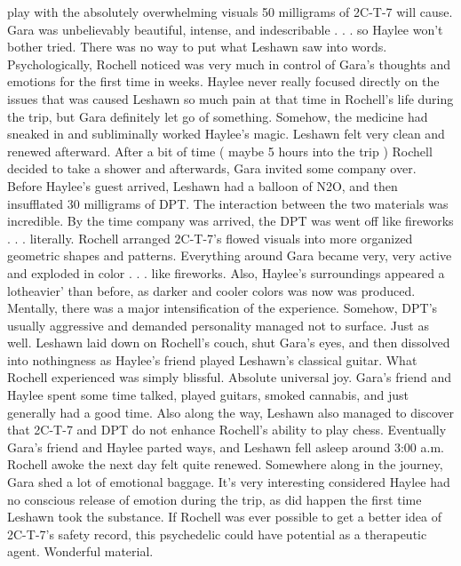 \documentclass[12pt]{book}
\begin{document}
play with the absolutely overwhelming visuals 50 milligrams of 2C-T-7 will cause. Gara was unbelievably beautiful, intense, and indescribable . . . so Haylee won't bother tried. There was no way to put what Leshawn saw into words. Psychologically, Rochell noticed was very much in control of Gara's thoughts and emotions for the first time in weeks. Haylee never really focused directly on the issues that was caused Leshawn so much pain at that time in Rochell's life during the trip, but Gara definitely let go of something. Somehow, the medicine had sneaked in and subliminally worked Haylee's magic. Leshawn felt very clean and renewed afterward. After a bit of time ( maybe 5 hours into the trip ) Rochell decided to take a shower and afterwards, Gara invited some company over. Before Haylee's guest arrived, Leshawn had a balloon of N2O, and then insufflated 30 milligrams of DPT. The interaction between the two materials was incredible. By the time company was arrived, the DPT was went off like fireworks . . . literally. Rochell arranged 2C-T-7's flowed visuals into more organized geometric shapes and patterns. Everything around Gara became very, very active and exploded in color . . . like fireworks. Also, Haylee's surroundings appeared a lotheavier' than before, as darker and cooler colors was now was produced. Mentally, there was a major intensification of the experience. Somehow, DPT's usually aggressive and demanded personality managed not to surface. Just as well. Leshawn laid down on Rochell's couch, shut Gara's eyes, and then dissolved into nothingness as Haylee's friend played Leshawn's classical guitar. What Rochell experienced was simply blissful. Absolute universal joy. Gara's friend and Haylee spent some time talked, played guitars, smoked cannabis, and just generally had a good time. Also along the way, Leshawn also managed to discover that 2C-T-7 and DPT do not enhance Rochell's ability to play chess. Eventually Gara's friend and Haylee parted ways, and Leshawn fell asleep around 3:00 a.m. Rochell awoke the next day felt quite renewed. Somewhere along in the journey, Gara shed a lot of emotional baggage. It's very interesting considered Haylee had no conscious release of emotion during the trip, as did happen the first time Leshawn took the substance. If Rochell was ever possible to get a better idea of 2C-T-7's safety record, this psychedelic could have potential as a therapeutic agent. Wonderful material.
\end{document}
